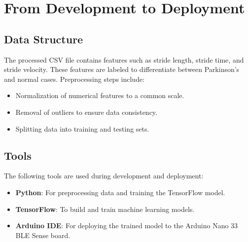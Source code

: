 
%
%
%
%

\section{From Development to Deployment}

\subsection{Data Structure}
The processed CSV file contains features such as stride length, stride time, and stride velocity. These features are labeled to differentiate between Parkinson's and normal cases. Preprocessing steps include:
\begin{itemize}
	\item Normalization of numerical features to a common scale.
	\item Removal of outliers to ensure data consistency.
	\item Splitting data into training and testing sets.
\end{itemize}

\subsection{Tools}
The following tools are used during development and deployment:
\begin{itemize}
	\item \textbf{Python}: For preprocessing data and training the TensorFlow model.
	\item \textbf{TensorFlow}: To build and train machine learning models.
	\item \textbf{Arduino IDE}: For deploying the trained model to the Arduino Nano 33 BLE Sense board.
\end{itemize}

